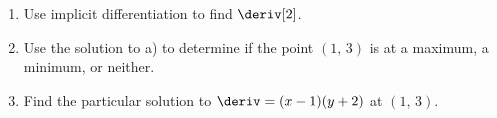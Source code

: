 \begin{enumerate}[label=\hspace{11pt}(\alph*), align=left, leftmargin=*, labelsep=0.25em]
    \item Use implicit differentiation to find $\deriv[2]$.
    \item Use the solution to a) to determine if the point $(1, \, 3)$ is at a maximum, a minimum, or neither.
    \item Find the particular solution to $\deriv = (x - 1)(y + 2)$ at $(1, \, 3)$.
\end{enumerate} \vspace{11pt}

